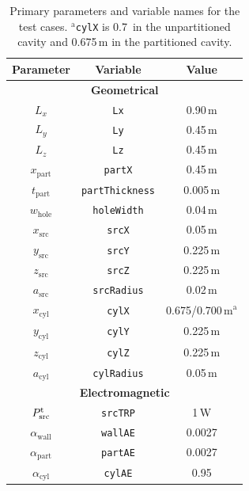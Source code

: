 \documentclass[a4paper]{article}
\numberwithin{equation}{section}
\begin{document}
\begin{table}[ht]
\begin{center}
\begin{tabular}{|c|c|c|}
\hline
\textbf{Parameter}     &\textbf{Variable}      & \textbf{Value} \\
\hline
\multicolumn{3}{|c|}{\textbf{Geometrical}} \\
\hline
$L_x$                  &\texttt{Lx}            &0.90\,m \\
$L_y$                  &\texttt{Ly}            &0.45\,m \\
$L_z$                  &\texttt{Lz}            &0.45\,m \\
$x_\mathrm{part}$      &\texttt{partX}         &0.45\,m \\
$t_\mathrm{part}$      &\texttt{partThickness} &0.005\,m \\
$w_\mathrm{hole}$      &\texttt{holeWidth}     &0.04\,m \\
$x_\mathrm{src}$       &\texttt{srcX}          &0.05\,m \\
$y_\mathrm{src}$       &\texttt{srcY}          &0.225\,m \\
$z_\mathrm{src}$       &\texttt{srcZ}          &0.225\,m \\
$a_\mathrm{src}$       &\texttt{srcRadius}     &0.02\,m \\
$x_\mathrm{cyl}$       &\texttt{cylX}          &0.675/0.700\,m$^\mathrm{a}$ \\
$y_\mathrm{cyl}$       &\texttt{cylY}          &0.225\,m \\
$z_\mathrm{cyl}$       &\texttt{cylZ}          &0.225\,m \\
$a_\mathrm{cyl}$       &\texttt{cylRadius}     &0.05\,m \\
\hline
\multicolumn{3}{|c|}{\textbf{Electromagnetic}} \\
\hline
$P^{\mathrm{t}}_\mathrm{src}$   &\texttt{srcTRP}        &1\,W \\
$\alpha_\mathrm{wall}$ &\texttt{wallAE}        &0.0027 \\
$\alpha_\mathrm{part}$ &\texttt{partAE}        &0.0027 \\
$\alpha_\mathrm{cyl}$  &\texttt{cylAE}         &0.95 \\
\hline
\end{tabular}
\end{center}
\caption{\label{tb:tcparam} Primary parameters and variable names for the test cases. 
$^\mathrm{a}$\texttt{cylX} is 0.7\, in the unpartitioned cavity and 0.675\,m in the
partitioned cavity.}
\end{table}
\end{document}
